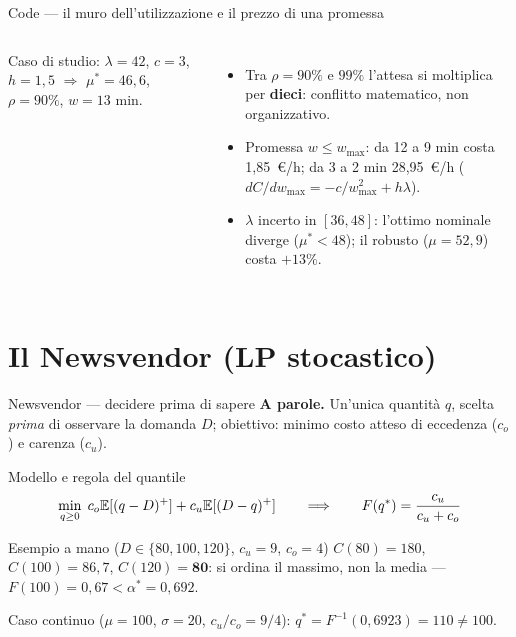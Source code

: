 \documentclass[11pt,aspectratio=169]{beamer}
\begin{document}
\begin{frame}{Code --- il muro dell'utilizzazione e il prezzo di una promessa}
\begin{columns}
\small
Caso di studio: $\lambda = 42$, $c = 3$, $h = 1{,}5$ $\Rightarrow$
$\mu^* = 46{,}6$, $\rho = 90\%$, $w = 13$ min.
\begin{itemize}
  \item Tra $\rho = 90\%$ e $99\%$ l'attesa si moltiplica per \textbf{dieci}:
        conflitto matematico, non organizzativo.
  \item Promessa $w \le w_{\max}$: da 12 a 9 min costa 1,85~\euro/h; da 3 a 2 min
        \alert{28,95}~\euro/h ($dC/dw_{\max} = -c/w_{\max}^2 + h\lambda$).
  \item $\lambda$ incerto in $[36, 48]$: l'ottimo nominale \alert{diverge}
        ($\mu^* < 48$); il robusto ($\mu = 52{,}9$) costa $+13\%$.
\end{itemize}
\end{columns}
\end{frame}

\section{Il Newsvendor (LP stocastico)}

\begin{frame}{Newsvendor --- decidere prima di sapere}
\textbf{A parole.} Un'unica quantità $q$, scelta \emph{prima} di osservare la
domanda $D$; obiettivo: minimo costo atteso di eccedenza ($c_o$) e carenza ($c_u$).
\begin{block}{Modello e regola del quantile}
\vspace{-1ex}
\[
\min_{q \ge 0}\; c_o \mathbb{E}[(q - D)^+] + c_u \mathbb{E}[(D - q)^+]
\qquad\Longrightarrow\qquad
F(q^*) = \frac{c_u}{c_u + c_o}
\]
\end{block}
\begin{block}{Esempio a mano ($D \in \{80, 100, 120\}$, $c_u = 9$, $c_o = 4$)}
$C(80) = 180$, $C(100) = 86{,}7$, $C(120) = \textbf{80}$: si ordina il
\alert{massimo}, non la media --- $F(100) = 0{,}67 < \alpha^* = 0{,}692$.
\end{block}
Caso continuo ($\mu = 100$, $\sigma = 20$, $c_u/c_o = 9/4$):
$q^* = F^{-1}(0{,}6923) = 110 \ne 100$.
\end{frame}
\end{document}
